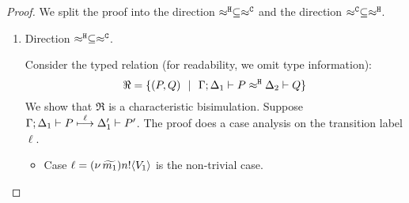 \begin{proof}
	\noi
	We split the proof into the direction
	$\approx^\mathtt{H} \subseteq \approx^\mathtt{C}$ and the direction
	$\approx^\mathtt{C} \subseteq \approx^\mathtt{H}$.

	\begin{enumerate}
		\item	Direction $\approx^\mathtt{H} \subseteq \approx^\mathtt{C}$.

				\noi Consider the typed relation (for readability, we omit type information):
				\[
					\Re = \{
								(P, Q) 
								\ \ |\ \ 
								\Gamma; \Delta_1 \vdash P \approx^\mathtt{H} \Delta_2 \vdash Q\}
				\]
				We show that $\Re$ is a characteristic bisimulation.
				Suppose
				$
						\Gamma; \Delta_1 \vdash P \stackrel{ \ell}{\longmapsto} \Delta_1' \vdash P'
				$.
				The proof does a case analysis on the transition label $\ell$.
				\begin{itemize}
					\item	Case $\ell = (\nu\, \widetilde{m_1}) n ! \langle V_1 \rangle$ is the non-trivial case.


\end{itemize}
\end{enumerate}
\end{proof}
